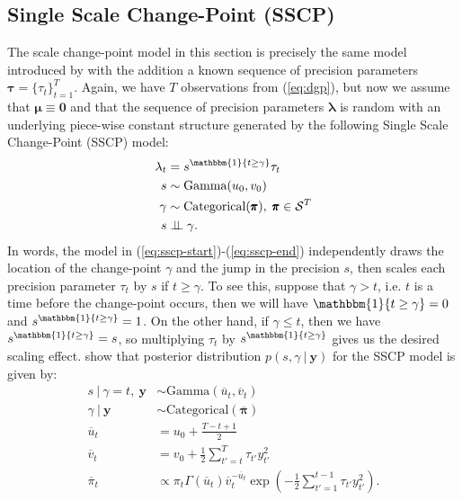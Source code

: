 \subsection{Single Scale Change-Point (SSCP)}
\label{sec:sscp}

The scale change-point model in this section is precisely the same model introduced by \cite{Cappello22} with the addition a known sequence of precision parameters $\pmb{\tau}=\{\tau_t\}_{t=1}^{T}$. Again, we have $T$ observations from (\ref{eq:dgp}), but now we assume that $\pmb{\mu} \equiv \mathbf{0}$ and that the sequence of precision parameters $\pmb{\lambda}$ is random with an underlying piece-wise constant structure generated by the following Single Scale Change-Point (SSCP) model:
\begin{align}\label{eq:sscp-start}
    \lambda_t &= s^{\mathbbm{1}\{t \geq \gamma\}}\tau_t  \\
    s &\sim \text{Gamma}(u_0,v_0) \\
    \gamma &\sim \text{Categorical}(\pmb{\pi}),\; \pmb{\pi} \in \mathcal{S}^T \\
    s &\indep \gamma.
    \label{eq:sscp-end}
\end{align}
In words, the model in (\ref{eq:sscp-start})-(\ref{eq:sscp-end}) independently draws the location of the change-point $\gamma$ and the jump in the precision $s$, then scales each precision parameter $\tau_t$ by $s$ if $t \geq \gamma$. To see this, suppose that $\gamma > t$, i.e. $t$ is a time before the change-point occurs, then we will have $\mathbbm{1}\{t \geq \gamma\} = 0$ and $s^{\mathbbm{1}\{t \geq \gamma\}} = 1$. On the other hand, if $\gamma \leq t$, then we have $s^{\mathbbm{1}\{t \geq \gamma\}} = s$, so multiplying $\tau_t$ by $s^{\mathbbm{1}\{t \geq \gamma\}}$ gives us the desired scaling effect. \cite{Cappello22} show that posterior distribution $p(s, \gamma\:|\:\mathbf{y})$ for the SSCP model is given by:
\begin{align}
    s \:|\: \gamma = t, \: \mathbf{y} &\sim \text{Gamma}\left(\overline{u}_{t}, \overline{v}_{t}\right) \label{eq:s-sscp} \\
    \gamma \:|\: \mathbf{y}&\sim \text{Categorical}(\overline{\pmb{\pi}}) \label{eq:gamma-sscp}\\
    \overline{u}_{t} &= u_0 + \frac{T - t + 1}{2} \\
    \overline{v}_{t} &= v_0 + \frac{1}{2} \sum_{t'=t}^{T} \tau_{t'}y_{t'}^2 \\
    \overline{\pi}_t &\propto \pi_t \Gamma(\overline{u}_{t}) \overline{v}_{t}^{-\overline{u}_{t}}\exp\left(- \frac{1}{2}\sum_{t'=1}^{t-1} \tau_{t'}y_{t'}^2\right). \label{eq:pi-sscp}
\end{align}
